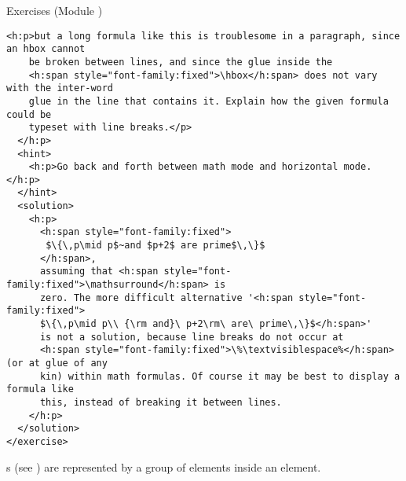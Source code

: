 \begin{module}[id=quiz]
\begin{omgroup}[id=quiz,short=Exercises]{Exercises (Module {})}
\begin{lstlisting}[label=lst:texbook-exercise,escapechar=\%,
  caption={An Exercise from the {\TeX}Book},
  index={exercise,hint,solution}]
  <h:p>but a long formula like this is troublesome in a paragraph, since an hbox cannot
    be broken between lines, and since the glue inside the 
    <h:span style="font-family:fixed">\hbox</h:span> does not vary with the inter-word
    glue in the line that contains it. Explain how the given formula could be
    typeset with line breaks.</p>
  </h:p>
  <hint>
    <h:p>Go back and forth between math mode and horizontal mode.</h:p>
  </hint>
  <solution>
    <h:p>
      <h:span style="font-family:fixed">
       $\{\,p\mid p$~and $p+2$ are prime$\,\}$
      </h:span>,
      assuming that <h:span style="font-family:fixed">\mathsurround</h:span> is
      zero. The more difficult alternative '<h:span style="font-family:fixed">
      $\{\,p\mid p\\ {\rm and}\ p+2\rm\ are\ prime\,\}$</h:span>'
      is not a solution, because line breaks do not occur at 
      <h:span style="font-family:fixed">\%\textvisiblespace%</h:span> (or at glue of any
      kin) within math formulas. Of course it may be best to display a formula like
      this, instead of breaking it between lines.
    </h:p>
  </solution>
</exercise>
\end{lstlisting}

 {s} (see {}) are represented by a
  group of {} elements inside an {} element.


\end{omgroup}
\end{module}
